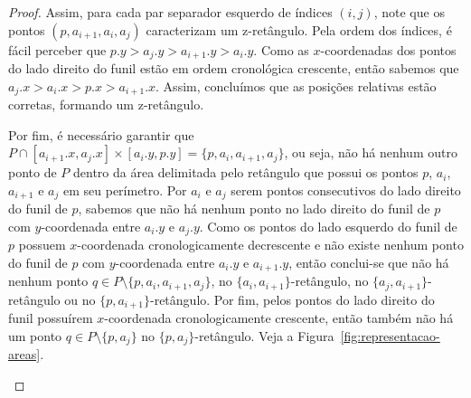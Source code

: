 \begin{proof}
    Assim, para cada par separador esquerdo de índices $(i,j)$, note que os pontos $(p,a_{i+1},a_i,a_j)$ caracterizam um z-retângulo. Pela ordem dos índices, é fácil perceber que $p.y > a_j.y > a_{i+1}.y > a_i.y$. Como as $x$-coordenadas dos pontos do lado direito do funil estão em ordem cronológica crescente, então sabemos que $a_j.x > a_i.x > p.x > a_{i+1}.x$. Assim, concluímos que as posições relativas estão corretas, formando um z-retângulo.

    Por fim, é necessário garantir que $P \cap [a_{i+1}.x,a_j.x] \times [a_i.y,p.y] = \{p,a_i,a_{i+1},a_j\}$, ou seja, não há nenhum outro ponto de $P$ dentro da área delimitada pelo retângulo que possui os pontos $p$, $a_i$, $a_{i+1}$ e $a_j$ em seu perímetro. Por $a_i$ e $a_j$ serem pontos consecutivos do lado direito do funil de $p$, sabemos que não há nenhum ponto no lado direito do funil de $p$ com $y$-coordenada entre $a_i.y$ e $a_j.y$. Como os pontos do lado esquerdo do funil de $p$ possuem $x$-coordenada cronologicamente decrescente e não existe nenhum ponto do funil de $p$ com $y$-coordenada entre $a_i.y$ e $a_{i+1}.y$, então conclui-se que não há nenhum ponto $q \in P \setminus \{p,a_i,a_{i+1},a_j\}$, no $\{a_i,a_{i+1}\}$-retângulo, no $\{a_j,a_{i+1}\}$-retângulo ou no $\{p,a_{i+1}\}$-retângulo. Por fim, pelos pontos do lado direito do funil possuírem $x$-coordenada cronologicamente crescente, então também não há um ponto $q \in P \setminus \{p,a_j\}$ no $\{p,a_j\}$-retângulo. Veja a Figura~\ref{fig:representacao-areas}. 

    \begin{figure}
\end{figure}
\end{proof}
